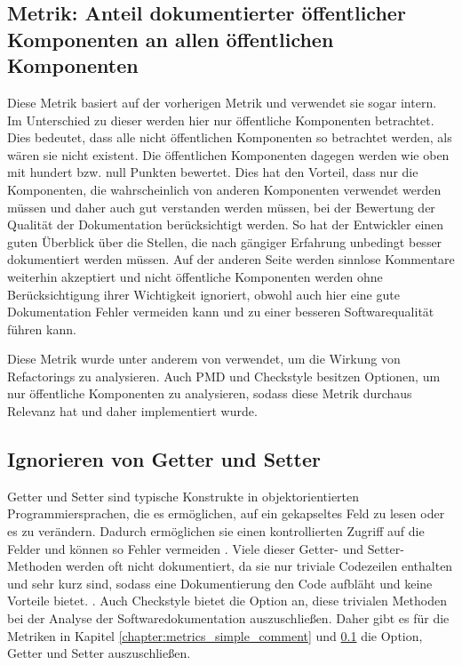 \subsection{Metrik: Anteil dokumentierter öffentlicher Komponenten an allen öffentlichen Komponenten }\label{chapter:public_members}
Diese Metrik basiert auf der vorherigen Metrik und verwendet sie sogar intern. Im Unterschied zu dieser werden hier nur öffentliche Komponenten betrachtet. Dies bedeutet, dass alle nicht öffentlichen Komponenten so betrachtet werden, als wären sie nicht existent. Die öffentlichen Komponenten dagegen werden wie oben mit hundert bzw. null Punkten bewertet. Dies hat den Vorteil, dass nur die Komponenten, die wahrscheinlich von anderen Komponenten verwendet werden müssen und daher auch gut verstanden werden müssen, bei der Bewertung der Qualität der Dokumentation berücksichtigt werden. So hat der Entwickler einen guten Überblick über die Stellen, die nach gängiger Erfahrung unbedingt besser dokumentiert werden müssen. Auf der anderen Seite werden sinnlose Kommentare weiterhin akzeptiert und nicht öffentliche Komponenten werden ohne Berücksichtigung ihrer Wichtigkeit ignoriert, obwohl auch hier eine gute Dokumentation Fehler vermeiden kann und zu einer besseren Softwarequalität führen kann. 

Diese Metrik wurde unter anderem von \cite{Doautomaticrefactoringsimprovemaintainability?Anindustrialcasestudy} verwendet, um die Wirkung von Refactorings zu analysieren. Auch PMD und Checkstyle besitzen Optionen, um nur öffentliche Komponenten zu analysieren, sodass diese Metrik durchaus Relevanz hat und daher implementiert wurde.

 \subsection{Ignorieren von Getter und Setter }
Getter und Setter sind typische Konstrukte in objektorientierten Programmiersprachen, die es ermöglichen, auf ein gekapseltes Feld zu lesen oder es zu verändern. Dadurch ermöglichen sie einen kontrollierten Zugriff auf die Felder und können so Fehler vermeiden \cite[S. 235]{OntheUseofPropertiesinJavaApplications}. Viele dieser Getter- und Setter-Methoden werden oft nicht dokumentiert, da sie nur triviale Codezeilen enthalten und sehr kurz sind, sodass eine Dokumentierung den Code aufbläht und keine Vorteile bietet. \cite[S. 254]{JavadocViolationsandTheirEvolutioninOpen-SourceSoftware}. Auch Checkstyle bietet die Option an, diese trivialen Methoden bei der Analyse der Softwaredokumentation auszuschließen. Daher gibt es für die Metriken in Kapitel \ref{chapter:metrics_simple_comment} und \ref{chapter:public_members} die Option, Getter und Setter auszuschließen.

